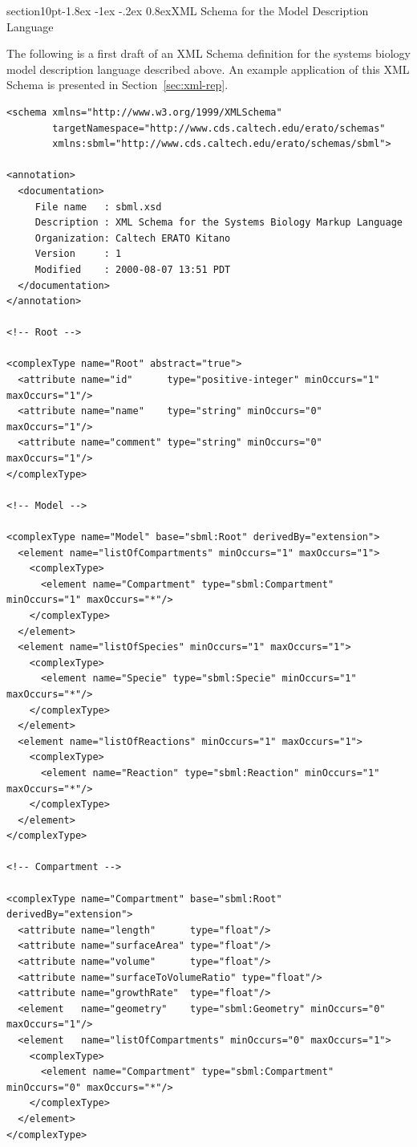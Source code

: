 \documentclass[10pt]{article}
\makeatletter
\renewcommand{\section}{\@startsection%
  {section}{1}{0pt}{-1.8ex \@plus -1ex \@minus -.2ex}%
  {0.8ex}{\normalfont\Large\bfseries}}
\newcommand{\tightspacing}{\renewcommand{\baselinestretch}{0.85}}
\makeatother
\begin{document}
\section{XML Schema for the Model Description Language}
\label{apdx:schemas}

The following is a first draft of an XML Schema definition for the systems
biology model description language described above.  An example application
of this XML Schema is presented in Section~\ref{sec:xml-rep}.


\begin{small}
\tightspacing
\begin{verbatim}
<schema xmlns="http://www.w3.org/1999/XMLSchema"
        targetNamespace="http://www.cds.caltech.edu/erato/schemas"
        xmlns:sbml="http://www.cds.caltech.edu/erato/schemas/sbml">

<annotation>
  <documentation>
     File name   : sbml.xsd
     Description : XML Schema for the Systems Biology Markup Language
     Organization: Caltech ERATO Kitano
     Version     : 1
     Modified    : 2000-08-07 13:51 PDT
  </documentation>
</annotation>

<!-- Root -->

<complexType name="Root" abstract="true">
  <attribute name="id"      type="positive-integer" minOccurs="1" maxOccurs="1"/>
  <attribute name="name"    type="string" minOccurs="0" maxOccurs="1"/>
  <attribute name="comment" type="string" minOccurs="0" maxOccurs="1"/>
</complexType>

<!-- Model -->

<complexType name="Model" base="sbml:Root" derivedBy="extension">
  <element name="listOfCompartments" minOccurs="1" maxOccurs="1">
    <complexType>
      <element name="Compartment" type="sbml:Compartment" minOccurs="1" maxOccurs="*"/>
    </complexType>
  </element>
  <element name="listOfSpecies" minOccurs="1" maxOccurs="1">
    <complexType>
      <element name="Specie" type="sbml:Specie" minOccurs="1" maxOccurs="*"/>
    </complexType>
  </element>
  <element name="listOfReactions" minOccurs="1" maxOccurs="1">
    <complexType>
      <element name="Reaction" type="sbml:Reaction" minOccurs="1" maxOccurs="*"/>
    </complexType>
  </element>
</complexType>

<!-- Compartment -->

<complexType name="Compartment" base="sbml:Root" derivedBy="extension">
  <attribute name="length"      type="float"/>
  <attribute name="surfaceArea" type="float"/>
  <attribute name="volume"      type="float"/>
  <attribute name="surfaceToVolumeRatio" type="float"/>
  <attribute name="growthRate"  type="float"/>
  <element   name="geometry"    type="sbml:Geometry" minOccurs="0" maxOccurs="1"/>
  <element   name="listOfCompartments" minOccurs="0" maxOccurs="1">
    <complexType>
      <element name="Compartment" type="sbml:Compartment" minOccurs="0" maxOccurs="*"/>
    </complexType>
  </element>
</complexType>


\end{verbatim}
\end{small}
\end{document}
